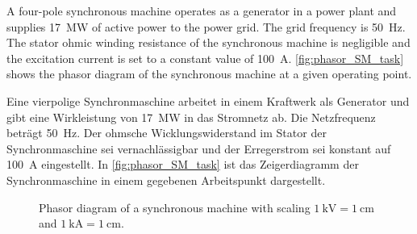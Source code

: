 

A four-pole synchronous machine operates as a generator in a power plant and supplies \SI{17}{\mega\watt} of active power to the power grid. The grid frequency is \SI{50}{\hertz}. The stator ohmic winding resistance of the synchronous machine is negligible and the excitation current is set to a constant value of \SI{100}{\ampere}. \autoref{fig:phasor_SM_task} shows the phasor diagram of the synchronous machine at a given operating point.

\begin{germanblock}
    Eine vierpolige Synchronmaschine arbeitet in einem Kraftwerk als Generator und gibt eine Wirkleistung von \SI{17}{\mega\watt} in das Stromnetz ab. Die Netzfrequenz beträgt \SI{50}{\hertz}. Der ohmsche Wicklungswiderstand im Stator der Synchronmaschine sei vernachlässigbar und der Erregerstrom sei konstant auf \SI{100}{\ampere} eingestellt. In \autoref{fig:phasor_SM_task} ist das Zeigerdiagramm der Synchronmaschine in einem gegebenen Arbeitspunkt dargestellt.
\end{germanblock}

\begin{figure}[h!]
    \centering
    \caption{Phasor diagram of a synchronous machine with scaling $\SI{1}{\kilo\volt} = \SI{1}{\centi\meter}$ and $\SI{1}{\kilo\ampere} = \SI{1}{\centi\meter}$.}
    \label{fig:phasor_SM_task}
\end{figure}


